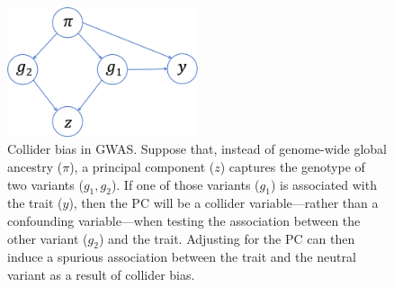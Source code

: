 \documentclass[12pt]{article}
\begin{document}
\begin{figure}
\center
\includegraphics[width=0.5\textwidth]{figs/finalfigs/fig7_dag_collider.png}
\caption{Collider bias in GWAS. Suppose that, instead of genome-wide global ancestry ($\pi$), a principal component ($z$) captures the genotype of two variants ($g_1, g_2$). If one of those variants ($g_1$) is associated with the trait ($y$), then the PC will be a collider variable---rather than a confounding variable---when testing the association between the other variant ($g_2$) and the trait. Adjusting for the PC can then induce a spurious association between the trait and the neutral variant as a result of collider bias.}
\label{fig:collider}
\end{figure}
\end{document}
